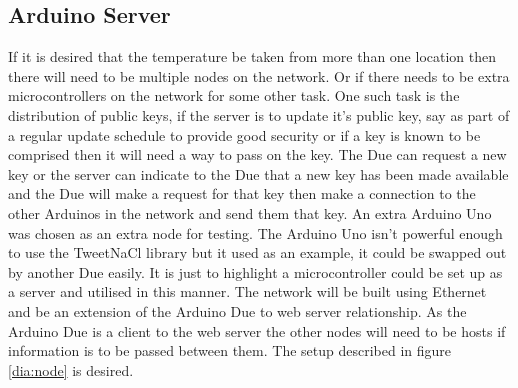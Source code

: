 \subsection{Arduino Server}

If it is desired that the temperature be taken from more than one location then there will need to be multiple nodes on the network. Or if there needs to be extra microcontrollers on the network for some other task. One such task is the distribution of public keys, if the server is to update it's public key, say as part of a regular update schedule to provide good security or if a key is known to be comprised then it will need a way to pass on the key. The Due can request a new key or the server can indicate to the Due that a new key has been made available and the Due will make a request for that key then make a connection to the other Arduinos in the network and send them that key. An extra Arduino Uno was chosen as an extra node for testing. The Arduino Uno isn't powerful enough to use the TweetNaCl library but it used as an example, it could be swapped out by another Due easily. It is just to highlight a microcontroller could be set up as a server and utilised in this manner. The network will be built using Ethernet and be an extension of the Arduino Due to web server relationship. As the Arduino Due is a client to the web server the other nodes will need to be hosts if information is to be passed between them. The setup described in figure \ref{dia:node} is desired. 